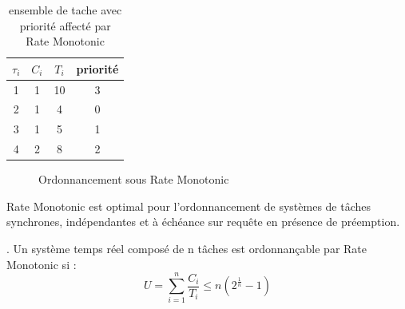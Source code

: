 \begin{table}[h]
\begin{center}
\begin{tabular}{|c|c|c|c|}
 \hline$\tau_i$ & $C_i$ & $T_i$ & priorité\\ 
 \hline1 & 1 & 10 & 3\\ 
 \hline2 & 1 & 4 & 0\\ 
 \hline3 & 1 & 5 & 1\\ 
 \hline4 & 2 & 8 & 2\\ 
 \hline
 \end{tabular}
\end{center}
\caption{ensemble de tache avec priorité affecté par Rate Monotonic} \label{tab:exempleRM}
\end{table}

\vspace{1cm}

\begin{figure}[h]
\begin{center}
\begin{RTGrid}[height=4cm,width=12cm,labelsize=8pt,numbersize=6]{4}{13}
\end{RTGrid}
\caption{Ordonnancement sous Rate Monotonic} \label{fig:exempleRM}
\end{center}
\end{figure}
\vspace{1cm}

\begin{theoreme}
Rate Monotonic est optimal pour l'ordonnancement de systèmes de tâches synchrones, indépendantes et à échéance sur requête en présence de préemption.
\end{theoreme}

\begin{theoreme}. Un système temps réel composé de n tâches est ordonnançable par Rate Monotonic si :
\begin{equation}
U = \sum_{i=1}^n \frac{C_i}{T_i} \leq n ( 2^{\frac{1}{n}} - 1)
\end{equation}
\end{theoreme}

